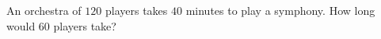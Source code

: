 An orchestra of $120$ players takes $40$ minutes to play a symphony. How long would $60$ players take?
